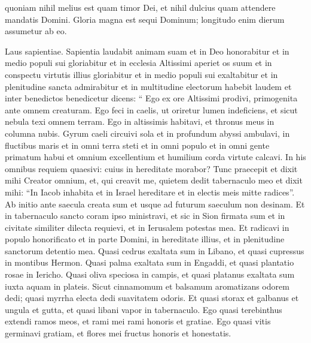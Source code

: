 \begin{biblechapter}
\begin{biblechapter}
\begin{biblechapter}
\begin{biblechapter}
\begin{biblechapter}
\begin{biblechapter}
\begin{biblechapter}
\begin{biblechapter}
\begin{biblechapter}
\begin{biblechapter}
\begin{biblechapter}
\begin{biblechapter}
\begin{biblechapter}
\begin{biblechapter}
\begin{biblechapter}
\begin{biblechapter}
\begin{biblechapter}
\begin{biblechapter}
\begin{biblechapter}
\begin{biblechapter}
\begin{biblechapter}
\begin{biblechapter}
\begin{biblechapter}
 quoniam nihil melius est quam timor Dei,
 et nihil dulcius quam attendere mandatis Domini.
 \verse Gloria magna est sequi Dominum;
 longitudo enim dierum assumetur ab eo.
 
\begin{biblechapter}
\verse Laus sapientiae.
 Sapientia laudabit animam suam et in Deo honorabitur
 et in medio populi sui gloriabitur
 \verse et in ecclesia Altissimi aperiet os suum
 et in conspectu virtutis illius gloriabitur
 \verse et in medio populi sui exaltabitur
 et in plenitudine sancta admirabitur
 \verse et in multitudine electorum habebit laudem
 et inter benedictos benedicetur dicens:
 \verse “ Ego ex ore Altissimi prodivi,
 primogenita ante omnem creaturam.
 \verse Ego feci in caelis, ut oriretur lumen indeficiens,
 et sicut nebula texi omnem terram.
 \verse Ego in altissimis habitavi,
 et thronus meus in columna nubis.
 \verse Gyrum caeli circuivi sola
 et in profundum abyssi ambulavi,
 \verse in fluctibus maris et in omni terra steti
 \verse et in omni populo et in omni gente primatum habui
 \verse et omnium excellentium et humilium corda virtute calcavi.
 In his omnibus requiem quaesivi:
 cuius in hereditate morabor?
 \verse Tunc praecepit et dixit mihi Creator omnium,
 et, qui creavit me, quietem dedit tabernaculo meo
 \verse et dixit mihi: “In Iacob inhabita et in Israel hereditare
 et in electis meis mitte radices”.
 \verse Ab initio ante saecula creata sum
 et usque ad futurum saeculum non desinam.
 \verse Et in tabernaculo sancto coram ipso ministravi,
 et sic in Sion firmata sum
 et in civitate similiter dilecta requievi,
 et in Ierusalem potestas mea.
 \verse Et radicavi in populo honorificato
 et in parte Domini, in hereditate illius,
 et in plenitudine sanctorum detentio mea.
 \verse Quasi cedrus exaltata sum in Libano,
 et quasi cupressus in montibus Hermon.
 \verse Quasi palma exaltata sum in Engaddi,
 et quasi plantatio rosae in Iericho.
 \verse Quasi oliva speciosa in campis,
 et quasi platanus exaltata sum iuxta aquam in plateis.
 \verse Sicut cinnamomum et balsamum aromatizans odorem dedi;
 quasi myrrha electa dedi suavitatem odoris.
 \verse Et quasi storax et galbanus et ungula et gutta,
 et quasi libani vapor in tabernaculo.
 \verse Ego quasi terebinthus extendi ramos meos,
 et rami mei rami honoris et gratiae.
 \verse Ego quasi vitis germinavi gratiam,
 et flores mei fructus honoris et honestatis.

\end{biblechapter}
\end{biblechapter}
\end{biblechapter}
\end{biblechapter}
\end{biblechapter}
\end{biblechapter}
\end{biblechapter}
\end{biblechapter}
\end{biblechapter}
\end{biblechapter}
\end{biblechapter}
\end{biblechapter}
\end{biblechapter}
\end{biblechapter}
\end{biblechapter}
\end{biblechapter}
\end{biblechapter}
\end{biblechapter}
\end{biblechapter}
\end{biblechapter}
\end{biblechapter}
\end{biblechapter}
\end{biblechapter}
\end{biblechapter}
